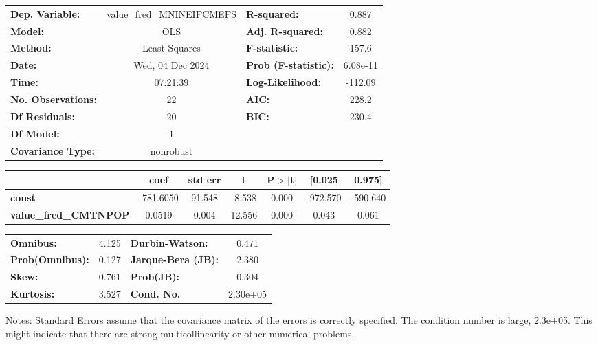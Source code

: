 \begin{center}
\begin{tabular}{lclc}
\toprule
\textbf{Dep. Variable:}       & value\_fred\_MNINEIPCMEPS & \textbf{  R-squared:         } &     0.887   \\
\textbf{Model:}               &            OLS            & \textbf{  Adj. R-squared:    } &     0.882   \\
\textbf{Method:}              &       Least Squares       & \textbf{  F-statistic:       } &     157.6   \\
\textbf{Date:}                &      Wed, 04 Dec 2024     & \textbf{  Prob (F-statistic):} &  6.08e-11   \\
\textbf{Time:}                &          07:21:39         & \textbf{  Log-Likelihood:    } &   -112.09   \\
\textbf{No. Observations:}    &               22          & \textbf{  AIC:               } &     228.2   \\
\textbf{Df Residuals:}        &               20          & \textbf{  BIC:               } &     230.4   \\
\textbf{Df Model:}            &                1          & \textbf{                     } &             \\
\textbf{Covariance Type:}     &         nonrobust         & \textbf{                     } &             \\
\bottomrule
\end{tabular}
\begin{tabular}{lcccccc}
                              & \textbf{coef} & \textbf{std err} & \textbf{t} & \textbf{P$> |$t$|$} & \textbf{[0.025} & \textbf{0.975]}  \\
\midrule
\textbf{const}                &    -781.6050  &       91.548     &    -8.538  &         0.000        &     -972.570    &     -590.640     \\
\textbf{value\_fred\_CMTNPOP} &       0.0519  &        0.004     &    12.556  &         0.000        &        0.043    &        0.061     \\
\bottomrule
\end{tabular}
\begin{tabular}{lclc}
\textbf{Omnibus:}       &  4.125 & \textbf{  Durbin-Watson:     } &    0.471  \\
\textbf{Prob(Omnibus):} &  0.127 & \textbf{  Jarque-Bera (JB):  } &    2.380  \\
\textbf{Skew:}          &  0.761 & \textbf{  Prob(JB):          } &    0.304  \\
\textbf{Kurtosis:}      &  3.527 & \textbf{  Cond. No.          } & 2.30e+05  \\
\bottomrule
\end{tabular}
\end{center}

Notes: \newline
 [1] Standard Errors assume that the covariance matrix of the errors is correctly specified. \newline
 [2] The condition number is large, 2.3e+05. This might indicate that there are \newline
 strong multicollinearity or other numerical problems.